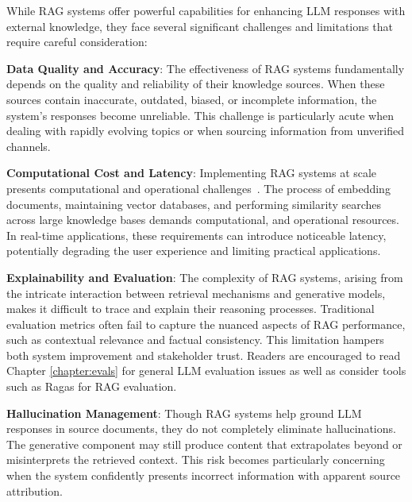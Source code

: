 While RAG systems offer powerful capabilities for enhancing LLM responses with external knowledge, they face several significant challenges and limitations that require careful consideration:
 
\textbf{Data Quality and Accuracy}: The effectiveness of RAG systems fundamentally depends on the quality and reliability of their knowledge sources. When these sources contain inaccurate, outdated, biased, or incomplete information, the system's responses become unreliable. This challenge is particularly acute when dealing with rapidly evolving topics or when sourcing information from unverified channels.
 
\textbf{Computational Cost and Latency}: Implementing RAG systems at scale presents computational and operational challenges~. The process of embedding documents, maintaining vector databases, and performing similarity searches across large knowledge bases demands computational, and operational resources. In real-time applications, these requirements can introduce noticeable latency, potentially degrading the user experience and limiting practical applications.
 
\textbf{Explainability and Evaluation}: The complexity of RAG systems, arising from the intricate interaction between retrieval mechanisms and generative models, makes it difficult to trace and explain their reasoning processes. Traditional evaluation metrics often fail to capture the nuanced aspects of RAG performance, such as contextual relevance and factual consistency. This limitation hampers both system improvement and stakeholder trust. Readers are encouraged to read Chapter \ref{chapter:evals} for general LLM evaluation issues as well as consider tools such as Ragas  for RAG evaluation.
 
\textbf{Hallucination Management}: Though RAG systems help ground LLM responses in source documents, they do not completely eliminate hallucinations. The generative component may still produce content that extrapolates beyond or misinterprets the retrieved context. This risk becomes particularly concerning when the system confidently presents incorrect information with apparent source attribution.

